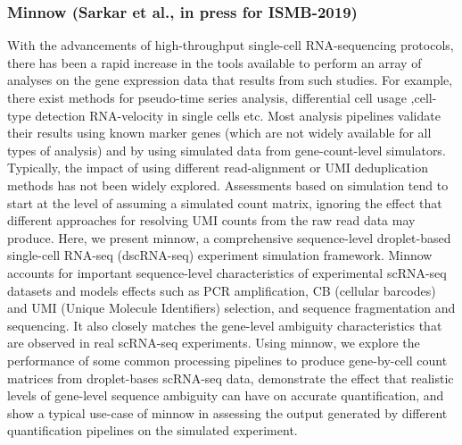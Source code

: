 \subsubsection{Minnow (Sarkar et al., in press for ISMB-2019)}
With the advancements of high-throughput single-cell RNA-sequencing protocols, there 
has been a rapid increase in the tools available to perform an array of analyses on the 
gene expression data that results from such studies.  For example, there exist methods 
for pseudo-time series analysis, differential cell usage ,cell-type detection RNA-velocity 
in single cells etc. Most analysis pipelines validate their results using known marker 
genes (which are not widely available for all types of analysis) and by using simulated 
data from gene-count-level simulators. Typically, the impact of using different 
read-alignment or UMI deduplication methods has not been widely explored. Assessments 
based on simulation tend to start at the level of assuming a simulated count matrix, 
ignoring the effect that different approaches for resolving UMI counts from the raw read 
data may produce. Here, we present minnow, a comprehensive sequence-level droplet-based 
single-cell RNA-seq (dscRNA-seq) experiment simulation framework.  Minnow accounts for 
important sequence-level characteristics of experimental scRNA-seq datasets and models 
effects such as PCR amplification,  CB (cellular barcodes) and UMI (Unique Molecule 
Identifiers) selection, and sequence fragmentation and sequencing. It also closely matches 
the gene-level ambiguity characteristics that are observed in real scRNA-seq experiments.  
Using minnow, we explore the performance of some common processing pipelines to produce 
gene-by-cell count matrices from droplet-bases scRNA-seq data, demonstrate the effect that 
realistic levels of gene-level sequence ambiguity can have on accurate quantification, 
and show a typical use-case of minnow in assessing the output generated by different 
quantification pipelines on the simulated experiment.
